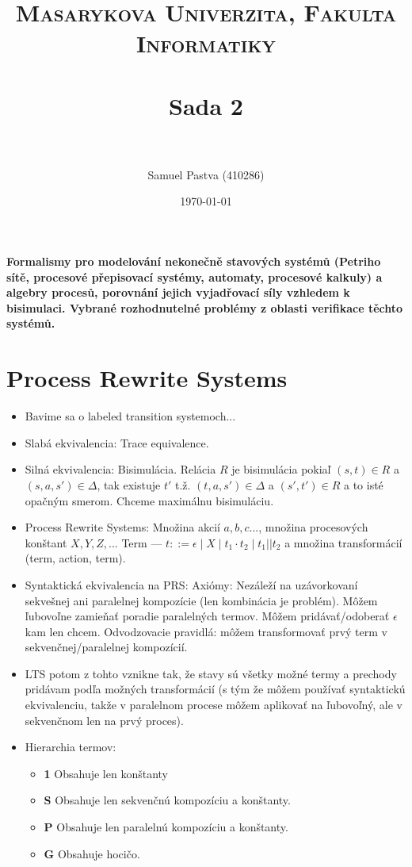 \documentclass[paper=a4, fontsize=11pt]{scrartcl} %
\title{	
	\normalfont \normalsize 
	\textsc{Masarykova Univerzita, Fakulta Informatiky} \\ [25pt] %
	\horrule{0.5pt} \\[0.4cm] %
	\huge Sada 2 \\ %
	\horrule{2pt} \\[0.5cm] %
}
\author{Samuel Pastva (410286)} %
\date{\normalsize\today} %
\numberwithin{equation}{section} %
\numberwithin{figure}{section} %
\numberwithin{table}{section} %
\begin{document}
	
	\textbf{Formalismy pro modelování nekonečně stavových systémů (Petriho sítě, procesové přepisovací systémy, automaty, procesové kalkuly) a algebry procesů, porovnání jejich vyjadřovací síly vzhledem k bisimulaci. Vybrané rozhodnutelné problémy z oblasti verifikace těchto systémů. }
	
	\section{Process Rewrite Systems}
	
	\begin{itemize}
		\item Bavime sa o labeled transition systemoch...
		\item Slabá ekvivalencia: Trace equivalence.
		\item Silná ekvivalencia: Bisimulácia. Relácia $R$ je bisimulácia pokiaľ $(s, t) \in R$ a $(s, a, s') \in \Delta$, tak existuje $t'$ t.ž. $(t, a, s') \in \Delta$ a $(s', t') \in R$ a to isté opačným smerom. Chceme maximálnu bisimuláciu.
		
		\item Process Rewrite Systems: Množina akcií $a,b,c ...$, množina procesových konštant $X, Y, Z, ...$ Term — $t ::= \epsilon \mid X \mid t_1 \cdot t_2 \mid t_1 || t_2$ a množina transformácií (term, action, term).
		
		\item Syntaktická ekvivalencia na PRS: Axiómy: Nezáleží na uzávorkovaní sekvešnej ani paralelnej kompozície (len kombinácia je problém). Môžem ľubovoľne zamieňať poradie paralelných termov. Môžem pridávať/odoberať $\epsilon$ kam len chcem. Odvodzovacie pravidlá: môžem transformovať prvý term v sekvenčnej/paralelnej kompozícií.
		
		\item LTS potom z tohto vznikne tak, že stavy sú všetky možné termy a prechody pridávam podľa možných transformácií (s tým že môžem používať syntaktickú ekvivalenciu, takže v paralelnom procese môžem aplikovať na ľubovoľný, ale v sekvenčnom len na prvý proces).
		
		\item Hierarchia termov:
		
		\begin{itemize}
			\item \textbf{1} Obsahuje len konštanty
			\item \textbf{S} Obsahuje len sekvenčnú kompozíciu a konštanty.
			\item \textbf{P} Obsahuje len paralelnú kompozíciu a konštanty.
			\item \textbf{G} Obsahuje hocičo.
		\end{itemize}
	

\end{itemize}
\end{document}
